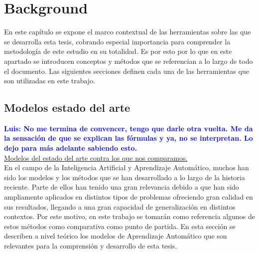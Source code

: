 \documentclass{uathesis-es}
\begin{document}





\chapter{Background}

En este capítulo se expone el marco contextual de las herramientas sobre las que se desarrolla esta tesis, cobrando especial importancia para comprender la metodología de este estudio en su totalidad. Es por esto por lo que en este apartado se introducen conceptos y métodos que se referencian a lo largo de todo el documento. Las siguientes secciones definen cada una de las herramientas que  son utilizadas en este trabajo.


\section{Modelos estado del arte}

\textcolor{blue}{\textbf{Luis: No me termina de convencer, tengo que darle otra vuelta. Me da la sensación de que se explican las fórmulas y ya, no se interpretan. Lo dejo para más adelante sabiendo esto.}}\\

\underline{Modelos del estado del arte contra los que nos comparamos.}\\

En el campo de la Inteligencia Artificial y Aprendizaje Automático, muchos han sido los modelos y los métodos que se han desarrollado a lo largo de la historia reciente. Parte de ellos han tenido una gran relevancia debido a que han sido ampliamente aplicados en distintos tipos de problemas ofreciendo gran calidad en sus resultados, llegando a una gran capacidad de generalización en distintos contextos. Por este motivo, en este trabajo se tomarán como referencia algunos de estos métodos como comparativa como punto de partida. En esta sección se describen a nivel teórico los modelos de Aprendizaje Automático que son relevantes para la comprensión y desarrollo de esta tesis. 
\end{document}
